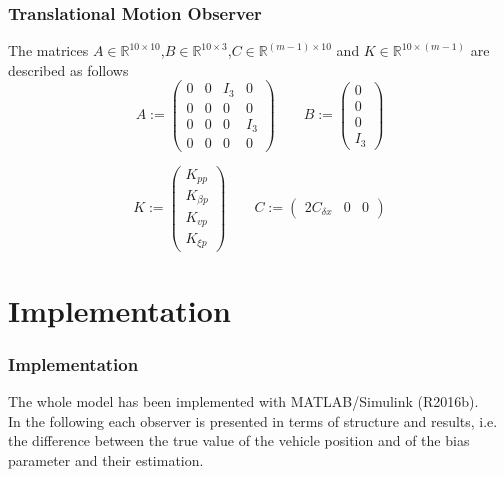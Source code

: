 \documentclass{beamer}
\begin{document}
		

	\begin{frame}
		\frametitle{Translational Motion Observer}
		The matrices $A \in \mathbb{R}^{10\times 10}$,$B \in \mathbb{R}^{10\times 3}$,$C \in \mathds{R}^{(m-1) \times 10} $ and $K \in \mathds{R}^{10 \times (m-1)}$ are described as follows
		$$
		A :=
		\begin{pmatrix}
		0 & 0 & I_3 & 0 \\ 
		0 & 0 & 0 & 0 \\
		0 & 0 & 0 & I_3 \\
		0 & 0 & 0 & 0
		\end{pmatrix}
		\qquad
		B := 
		\begin{pmatrix}
		0 \\ 0 \\ 0 \\ I_3
		\end{pmatrix}
		$$
		
		$$
		K := 
		\begin{pmatrix}
		K_{pp} \\ K_{\beta p} \\ K_{vp} \\ K_{\xi p}
		\end{pmatrix}
		\qquad
		C :=
		\begin{pmatrix}
		2C_{\delta x} & 0 & 0
		\end{pmatrix}
		$$
	\end{frame}
\section{Implementation}	
	\begin{frame}
		\frametitle{Implementation}
		The whole model has been implemented with MATLAB/Simulink (R2016b).
		\\
		\vspace{0.5cm}
		In the following each observer is presented in terms of structure and results, i.e. the difference between the true value of the vehicle position and of the bias parameter and their estimation.
	\end{frame}
	
\end{document}
